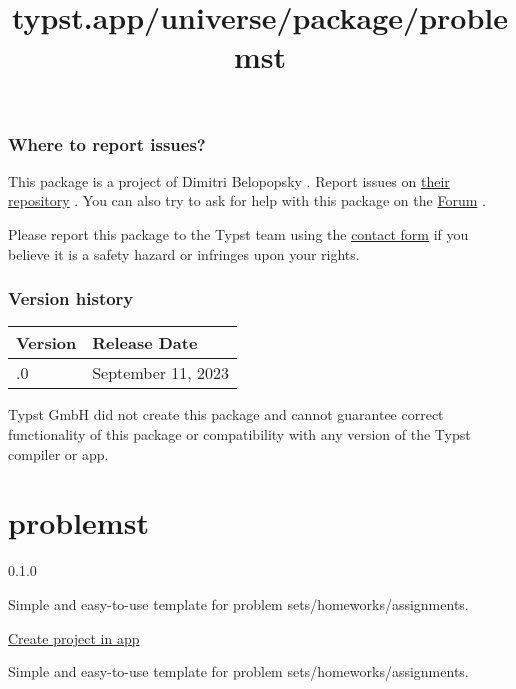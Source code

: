 \subsubsection{Where to report issues?}\label{where-to-report-issues}

This package is a project of Dimitri Belopopsky . Report issues on
\href{https://github.com/ShadowMitia/typst-babble-bubbles}{their
repository} . You can also try to ask for help with this package on the
\href{https://forum.typst.app}{Forum} .

Please report this package to the Typst team using the
\href{https://typst.app/contact}{contact form} if you believe it is a
safety hazard or infringes upon your rights.

\label{versions}
\subsubsection{Version history}\label{version-history}

\begin{longtable}[]{@{}ll@{}}
\toprule\noalign{}
Version & Release Date \\
\midrule\noalign{}
\endhead
\bottomrule\noalign{}
\endlastfoot
0.1.0 & September 11, 2023 \\
\end{longtable}

Typst GmbH did not create this package and cannot guarantee correct
functionality of this package or compatibility with any version of the
Typst compiler or app.


\title{typst.app/universe/package/problemst}

\label{banner}
\label{template-thumbnail}

\section{problemst}\label{problemst}

{ 0.1.0 }

Simple and easy-to-use template for problem sets/homeworks/assignments.

\href{/app?template=problemst&version=0.1.0}{Create project in app}

\label{readme}
Simple and easy-to-use template for problem sets/homeworks/assignments.

